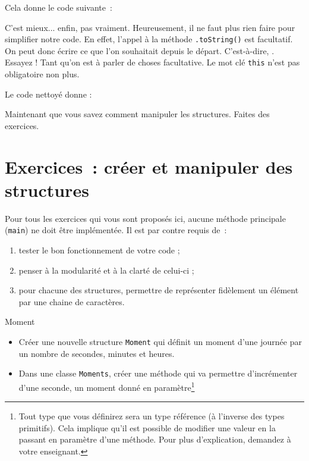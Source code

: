 \documentclass[a4paper,11pt]{article}
\begin{document}
	Cela donne le code suivante~:


	C'est mieux... enfin, pas vraiment. Heureusement, il ne faut plus rien faire
	pour simplifier notre code. En effet, l'appel à la méthode
	\texttt{.toString()} est facultatif. On peut donc écrire ce que l'on
	souhaitait depuis le départ. C'est-à-dire,
	. Essayez ! Tant qu'on est à parler de
	choses facultative. Le mot clé \texttt{this} n'est pas obligatoire non plus.

	Le code nettoyé donne :

	Maintenant que vous savez comment manipuler les \og structures\fg. Faites des exercices.


	\bigskip

\section{Exercices~: créer et manipuler des structures}
	
	Pour tous les exercices qui vous sont proposés ici, aucune méthode principale (\texttt{main}) ne doit être implémentée. Il est par contre requis de~:
	\begin{enumerate}
		\item tester le bon fonctionnement de votre code ;
		\item penser à la modularité et à la clarté de celui-ci ;
		\item pour chacune des structures, permettre de représenter fidèlement un élément par une chaine de caractères.
	\end{enumerate}

	\begin{Exercice}{Moment}
		\begin{itemize}
			\item
				Créer une nouvelle structure \texttt{Moment} qui définit un moment d'une journée par un nombre de secondes, minutes et heures.
			
			\item Dans une classe \texttt{Moments}, créer une méthode
				 qui va permettre
				d'incrémenter d'une seconde, un moment donné en
				paramètre\footnote{Tout type que vous définirez sera un type
					référence (à l'inverse des types primitifs). Cela implique
					qu'il est possible de modifier une valeur en la passant en
				paramètre d'une méthode. Pour plus d'explication, demandez
			à votre enseignant.}

		\end{itemize}		
	\end{Exercice}
\end{document}
